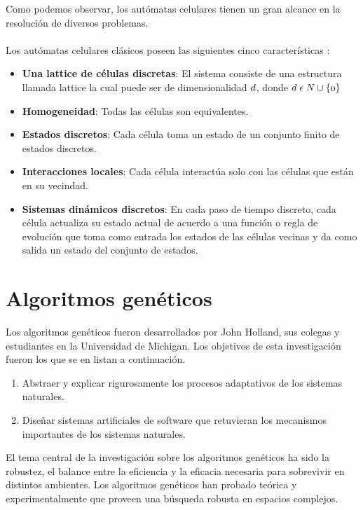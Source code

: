 Como podemos observar, los autómatas celulares tienen un gran alcance en la resolución de diversos problemas.
\\
\\
Los autómatas celulares clásicos poseen las siguientes cinco características \citep{ilachinski2001cellular}:

\begin{itemize}
	\item{\textbf{Una lattice de células discretas}: El sistema consiste de una estructura llamada lattice la cual puede ser de dimensionalidad  $\mathnormal{d}$, donde $\mathnormal{d\; \epsilon\; N\cup\{0\}}$}
	\item{\textbf{Homogeneidad}: Todas las células son equivalentes.}
	\item{\textbf{Estados discretos}: Cada célula toma un estado de un conjunto finito de estados discretos.}
	\item{\textbf{Interacciones locales}: Cada célula interactúa solo con las células que están en su vecindad.}
	\item{\textbf{Sistemas dinámicos discretos}: En cada paso de tiempo discreto, cada célula actualiza su estado actual de acuerdo a una función o regla de evolución que toma como entrada los estados de las células vecinas y da como salida un estado del conjunto de estados.}
\end{itemize}

\section{Algoritmos genéticos}

Los algoritmos genéticos fueron desarrollados por John Holland, sus colegas y estudiantes en la Universidad de Michigan. Los objetivos de esta investigación fueron los que se en listan a continuación.
\begin{enumerate}
	\item Abstraer y explicar rigurosamente los procesos adaptativos de los sistemas naturales.
	\item Diseñar sistemas artificiales de software que retuvieran los mecanismos importantes de los sistemas naturales.
\end{enumerate}

El tema central de la investigación sobre los algoritmos genéticos ha sido la robustez, el balance entre la eficiencia y la eficacia necesaria para sobrevivir en distintos ambientes. Los algoritmos genéticos han probado teórica y experimentalmente que proveen una búsqueda robusta en espacios complejos.

